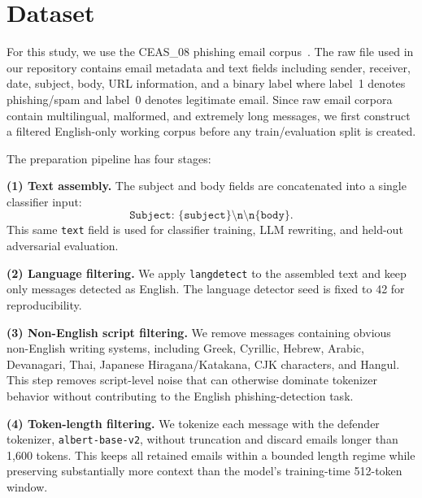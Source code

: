 

\section{Dataset}
For this study, we use the CEAS\_08 phishing email corpus~\cite{alam2024phishing}. The raw file used in our repository contains email metadata and text fields including sender, receiver, date, subject, body, URL information, and a binary label where label~1 denotes phishing/spam and label~0 denotes legitimate email. Since raw email corpora contain multilingual, malformed, and extremely long messages, we first construct a filtered English-only working corpus before any train/evaluation split is created.

The preparation pipeline has four stages:

\textbf{(1) Text assembly.} The subject and body fields are concatenated into a single classifier input:
\[
  \texttt{Subject: \{subject\}\textbackslash n\textbackslash n\{body\}}.
\]
This same \texttt{text} field is used for classifier training, LLM rewriting, and held-out adversarial evaluation.

\textbf{(2) Language filtering.} We apply \texttt{langdetect} to the assembled text and keep only messages detected as English. The language detector seed is fixed to 42 for reproducibility.

\textbf{(3) Non-English script filtering.} We remove messages containing obvious non-English writing systems, including Greek, Cyrillic, Hebrew, Arabic, Devanagari, Thai, Japanese Hiragana/Katakana, CJK characters, and Hangul. This step removes script-level noise that can otherwise dominate tokenizer behavior without contributing to the English phishing-detection task.

\textbf{(4) Token-length filtering.} We tokenize each message with the defender tokenizer, \texttt{albert-base-v2}, without truncation and discard emails longer than 1,600 tokens. This keeps all retained emails within a bounded length regime while preserving substantially more context than the model's training-time 512-token window.

